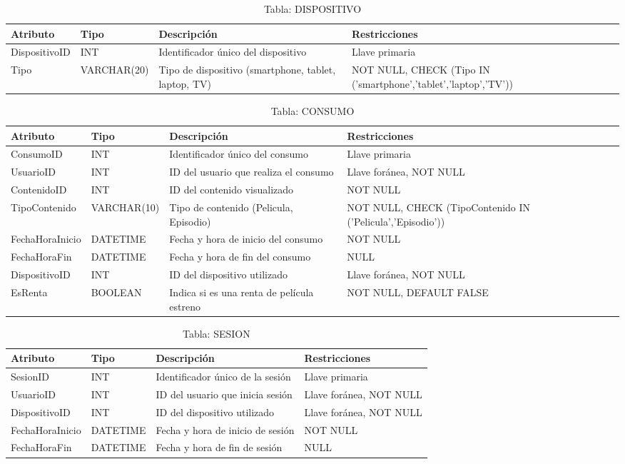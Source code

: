 \documentclass[12pt, a4paper]{article}
\begin{document}
\begin{table}[ht]
\centering
\caption{Tabla: DISPOSITIVO}
\begin{tabular}{|l|l|p{4.5cm}|p{3.5cm}|}
\hline
\textbf{Atributo} & \textbf{Tipo} & \textbf{Descripción} &
\textbf{Restricciones} \\
\hline
DispositivoID & INT & Identificador único del dispositivo & Llave primaria \\
\hline
Tipo & VARCHAR(20) & Tipo de dispositivo (smartphone, tablet, laptop, TV) & NOT
NULL, CHECK (Tipo IN ('smartphone','tablet','laptop','TV')) \\
\hline
\end{tabular}
\end{table}
\newpage

\begin{table}[ht]
\centering
\caption{Tabla: CONSUMO}
\begin{tabular}{|l|l|p{4.5cm}|p{3.5cm}|}
\hline
\textbf{Atributo} & \textbf{Tipo} & \textbf{Descripción} &
\textbf{Restricciones} \\
\hline
ConsumoID & INT & Identificador único del consumo & Llave primaria \\
\hline
UsuarioID & INT & ID del usuario que realiza el consumo & Llave foránea, NOT
NULL \\
\hline
ContenidoID & INT & ID del contenido visualizado & NOT NULL \\
\hline
TipoContenido & VARCHAR(10) & Tipo de contenido (Pelicula, Episodio) & NOT NULL,
CHECK (TipoContenido IN ('Pelicula','Episodio')) \\
\hline
FechaHoraInicio & DATETIME & Fecha y hora de inicio del consumo & NOT NULL \\
\hline
FechaHoraFin & DATETIME & Fecha y hora de fin del consumo & NULL \\
\hline
DispositivoID & INT & ID del dispositivo utilizado & Llave foránea, NOT NULL \\
\hline
EsRenta & BOOLEAN & Indica si es una renta de película estreno & NOT NULL,
DEFAULT FALSE \\
\hline
\end{tabular}
\end{table}
\newpage

\begin{table}[ht]
\centering
\caption{Tabla: SESION}
\begin{tabular}{|l|l|p{4.5cm}|p{3.5cm}|}
\hline
\textbf{Atributo} & \textbf{Tipo} & \textbf{Descripción} &
\textbf{Restricciones} \\
\hline
SesionID & INT & Identificador único de la sesión & Llave primaria \\
\hline
UsuarioID & INT & ID del usuario que inicia sesión & Llave foránea, NOT NULL \\
\hline
DispositivoID & INT & ID del dispositivo utilizado & Llave foránea, NOT NULL \\
\hline
FechaHoraInicio & DATETIME & Fecha y hora de inicio de sesión & NOT NULL \\
\hline
FechaHoraFin & DATETIME & Fecha y hora de fin de sesión & NULL \\
\hline
\end{tabular}
\end{table}
\newpage
\end{document}
